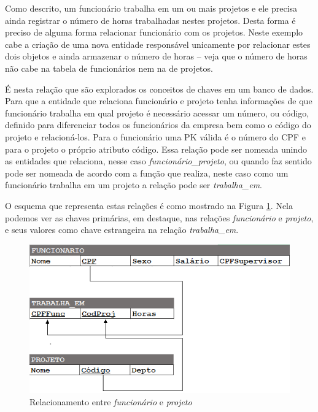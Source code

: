 Como descrito, um funcionário trabalha em um ou mais projetos e ele precisa ainda registrar o número 
de horas trabalhadas nestes projetos. Desta forma é preciso de alguma forma relacionar funcionário com os projetos. 
Neste exemplo cabe a criação de uma nova entidade responsável unicamente por relacionar estes dois objetos e ainda 
armazenar o número de horas -- veja que o número de horas não cabe na tabela de funcionários nem na de projetos.

É nesta relação que são explorados os conceitos de chaves em um banco de dados. Para que a entidade que relaciona 
funcionário e projeto tenha informações de que funcionário trabalha em qual projeto é necessário acessar um número, ou código, 
definido para diferenciar todos os funcionários da empresa bem como o código do projeto e relacioná-los. Para o funcionário 
uma PK válida é o número do CPF e para o projeto o próprio atributo código. Essa relação pode ser nomeada unindo 
as entidades que relaciona, nesse caso \textit{funcionário\_projeto}, ou quando faz sentido pode ser nomeada de acordo com a função 
que realiza, neste caso como um funcionário trabalha em um projeto a relação pode ser \textit{trabalha\_em}.

O esquema que representa estas relações é como mostrado na Figura \ref{fig:relacao_func_proj}. Nela podemos ver as chaves primárias, em destaque, nas relações \textit{funcionário} e \textit{projeto}, e seus valores como chave estrangeira na relação \textit{trabalha\_em}. 

\begin{figure}[htpb]
	\centering
		\includegraphics[width=13cm]{relacao_func_proj}
	\caption{Relacionamento entre \textit{funcionário} e \textit{projeto}}
	\label{fig:relacao_func_proj}
\end{figure}

